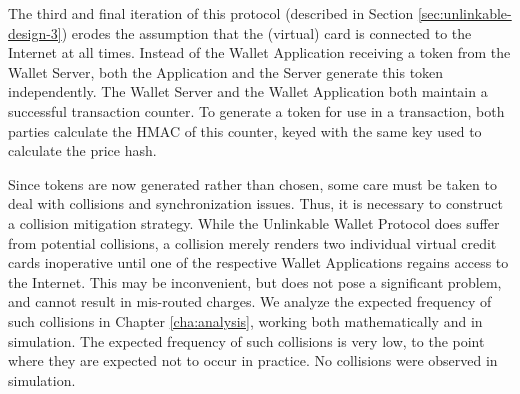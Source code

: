 The third and final iteration of this protocol (described in Section \ref{sec:unlinkable-design-3}) erodes the assumption that the (virtual) card is connected to the Internet at all times.
Instead of the Wallet Application receiving a token from the Wallet Server, both the Application and the Server generate this token independently.
The Wallet Server and the Wallet Application both maintain a successful transaction counter.
To generate a token for use in a transaction, both parties calculate the HMAC of this counter, keyed with the same key used to calculate the price hash.


Since tokens are now generated rather than chosen, some care must be taken to deal with collisions and synchronization issues.
Thus, it is necessary to construct a collision mitigation strategy.
While the Unlinkable Wallet Protocol does suffer from potential collisions,
    a collision merely renders two individual virtual credit cards inoperative until one of the respective Wallet Applications regains access to the Internet.
This may be inconvenient, but does not pose a significant problem, and cannot result in mis-routed charges.
We analyze the expected frequency of such collisions in Chapter \ref{cha:analysis}, working both mathematically and in simulation.
The expected frequency of such collisions is very low, to the point where they are expected not to occur in practice.
No collisions were observed in simulation.
